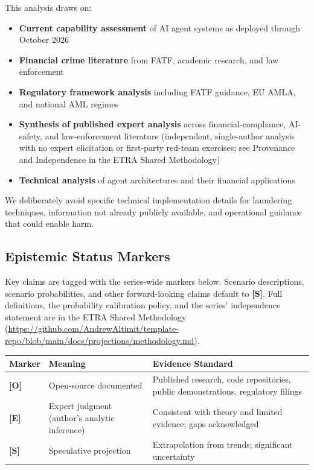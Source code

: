 \documentclass[11pt,letterpaper]{article}
\begin{document}
This analysis draws on:
\begin{itemize}
  \item \textbf{Current capability assessment} of AI agent systems as deployed through October 2026
  \item \textbf{Financial crime literature} from FATF, academic research, and law enforcement
  \item \textbf{Regulatory framework analysis} including FATF guidance, EU AMLA, and national AML regimes
  \item \textbf{Synthesis of published expert analysis} across financial-compliance, AI-safety, and law-enforcement literature (independent, single-author analysis with no expert elicitation or first-party red-team exercises; see Provenance and Independence in the ETRA Shared Methodology)
  \item \textbf{Technical analysis} of agent architectures and their financial applications
\end{itemize}

We deliberately avoid specific technical implementation details for laundering techniques, information not already publicly available, and operational guidance that could enable harm.

\subsection{Epistemic Status Markers}

Key claims are tagged with the series-wide markers below. Scenario descriptions, scenario probabilities, and other forward-looking claims default to \textbf{[S]}. Full definitions, the probability calibration policy, and the series' independence statement are in the ETRA Shared Methodology (\url{https://github.com/AndrewAltimit/template-repo/blob/main/docs/projections/methodology.md}).

\begingroup\small
\begin{longtable}{L{0.120\dimexpr{}\tabcolsep\relax}L{0.320\dimexpr{}\tabcolsep\relax}L{0.560\dimexpr{}\tabcolsep\relax}}
\toprule
\textbf{Marker} & \textbf{Meaning} & \textbf{Evidence Standard} \\
\midrule
\endhead
\textbf{[O]} & Open-source documented & Published research, code repositories, public demonstrations, regulatory filings \\
\textbf{[E]} & Expert judgment (author's analytic inference) & Consistent with theory and limited evidence; gaps acknowledged \\
\textbf{[S]} & Speculative projection & Extrapolation from trends; significant uncertainty \\
\bottomrule
\end{longtable}
\endgroup
\end{document}

